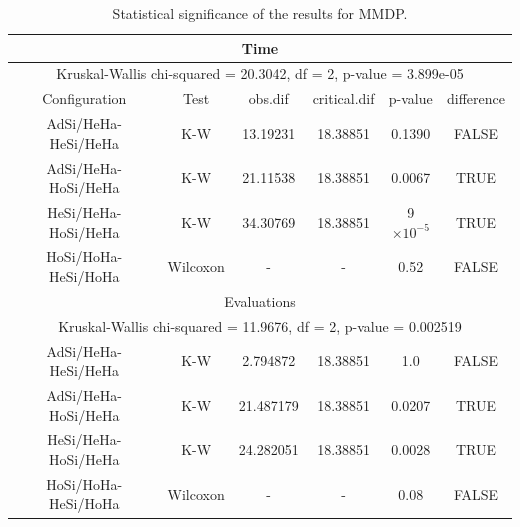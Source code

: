 \documentclass[final,1p,times]{elsarticle}
\providecommand{\e}[1]{\ensuremath{\times 10^{#1}}}
\begin{document}
\begin{table}
\centering
\caption{Statistical significance of the results for MMDP.}
\begin{tabular}{|c|c|c|c|c|c|} \hline
\multicolumn{6}{|c|}{Time} \\ \hline
\multicolumn{6}{|c|}{Kruskal-Wallis chi-squared = 20.3042, df = 2, p-value = 3.899e-05} \\ \hline
Configuration       & Test  & obs.dif   & critical.dif  & p-value & difference \\ \hline
AdSi/HeHa-HeSi/HeHa      & K-W   & 13.19231  &    18.38851   & 0.1390  &  FALSE \\ \hline
AdSi/HeHa-HoSi/HeHa      & K-W   & 21.11538  &    18.38851   & 0.0067  & TRUE \\ \hline
HeSi/HeHa-HoSi/HeHa & K-W   & 34.30769  &    18.38851   & 9\e{-5} & TRUE \\ \hline \hline
HoSi/HoHa-HeSi/HoHa & Wilcoxon & -      & -             & 0.52    & FALSE \\ \hline \hline


\multicolumn{6}{|c|}{Evaluations}  \\ \hline
\multicolumn{6}{|c|}{Kruskal-Wallis chi-squared = 11.9676, df = 2, p-value = 0.002519} \\ \hline
AdSi/HeHa-HeSi/HeHa      & K-W  & 2.794872   & 18.38851      &  1.0          & FALSE \\ \hline
AdSi/HeHa-HoSi/HeHa      & K-W  & 21.487179  & 18.38851      &  0.0207        & TRUE\\ \hline
HeSi/HeHa-HoSi/HeHa & K-W  & 24.282051  & 18.38851      &  0.0028        & TRUE \\ \hline \hline
HoSi/HoHa-HeSi/HoHa &Wilcoxon & -       & -             & 0.08           & FALSE \\ \hline 

\end{tabular}
\label{tab:significanceMMDP}
\end{table}
\end{document}
